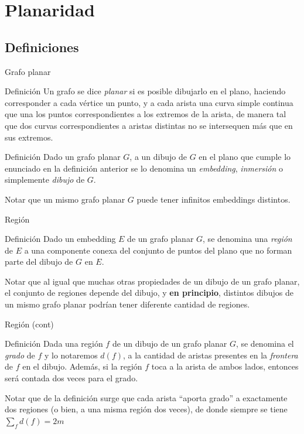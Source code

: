 \documentclass[compress]{beamer}
\begin{document}
\section{Planaridad}

\subsection{Definiciones}

\begin{frame}{Grafo planar}

\begin{block}{Definición}
    Un grafo se dice \textit{planar} si es posible dibujarlo en el plano, haciendo corresponder a cada vértice un punto, y a cada arista una curva simple continua que una los puntos correspondientes a los extremos de la arista, de manera tal que dos curvas correspondientes a aristas distintas no se intersequen más que en sus extremos.
\end{block}

\begin{block}{Definición}
    Dado un grafo planar $G$, a un dibujo de $G$ en el plano que cumple lo enunciado en la definición anterior se lo denomina un \textit{embedding}, \textit{inmersión} o simplemente \textit{dibujo} de $G$.
\end{block}

Notar que un mismo grafo planar $G$ puede tener infinitos embeddings distintos.

\end{frame}

\begin{frame}{Región}

\begin{block}{Definición}
    Dado un embedding $E$ de un grafo planar $G$, se denomina una \textit{región} de $E$ a una componente conexa del conjunto de puntos del plano que no forman parte del dibujo de $G$ en $E$.
\end{block}

Notar que al igual que muchas otras propiedades de un dibujo de un grafo planar, el conjunto de regiones depende del dibujo, y \textbf{en principio}, distintos dibujos de un mismo grafo planar podrían tener diferente cantidad de regiones.

\end{frame}

\begin{frame}{Región (cont)}

\begin{block}{Definición}
    Dada una región $f$ de un dibujo de un grafo planar $G$, se denomina el \textit{grado} de $f$ y lo notaremos $d(f)$, a la cantidad de aristas presentes en la \textit{frontera} de $f$ en el dibujo. Además, si la región $f$ toca
    a la arista de ambos lados, entonces será contada dos veces para el grado.
\end{block}

Notar que de la definición surge que cada arista ``aporta grado'' a exactamente dos regiones (o bien, a una misma región dos veces), de donde siempre se tiene $\sum_f {d(f)} = 2m$

\end{frame}
\end{document}
